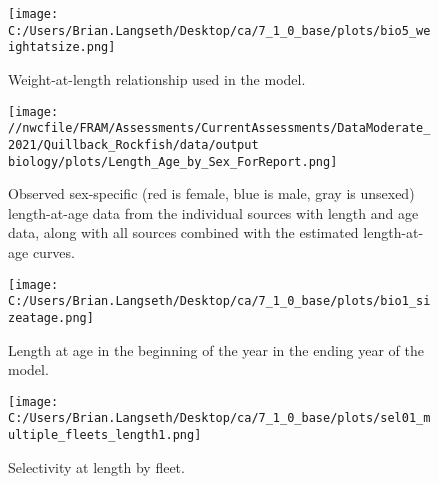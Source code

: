 \documentclass[11pt,
  english,
  letterpaper,
]{article}
\begin{document}
\tagmcend\tagstructend


\begin{figure}
\centering
\texttt{[image: C:/Users/Brian.Langseth/Desktop/ca/7\_1\_0\_base/plots/bio5\_weightatsize.png]}
\caption{Weight-at-length relationship used in the model.\label{fig:len-weight}}
\end{figure}

\tagmcend\tagstructend


\begin{figure}
\centering
\texttt{[image: //nwcfile/FRAM/Assessments/CurrentAssessments/DataModerate\_2021/Quillback\_Rockfish/data/output biology/plots/Length\_Age\_by\_Sex\_ForReport.png]}
\caption{Observed sex-specific (red is female, blue is male, gray is unsexed) length-at-age data from the individual sources with length and age data, along with all sources combined with the estimated length-at-age curves.\label{fig:len-age-data}}
\end{figure}

\tagmcend\tagstructend


\begin{figure}
\centering
\texttt{[image: C:/Users/Brian.Langseth/Desktop/ca/7\_1\_0\_base/plots/bio1\_sizeatage.png]}
\caption{Length at age in the beginning of the year in the ending year of the model.\label{fig:len-age-ss}}
\end{figure}

\tagmcend\tagstructend


\begin{figure}
\centering
\texttt{[image: C:/Users/Brian.Langseth/Desktop/ca/7\_1\_0\_base/plots/sel01\_multiple\_fleets\_length1.png]}
\caption{Selectivity at length by fleet.\label{fig:selex}}
\end{figure}
\end{document}
